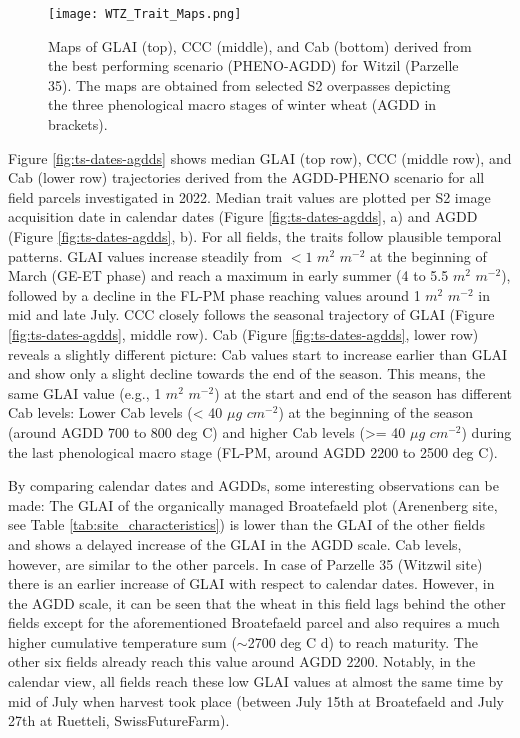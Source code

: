 \begin{figure}[H]
    \centering
    \texttt{[image: WTZ\_Trait\_Maps.png]}
    \caption[Maps of \gls{GLAI} (top), \gls{CCC} (middle), and \gls{Cab} (bottom) derived from the best performing scenario (PHENO-AGDD) for Witzil (Parzelle 35). The maps are obtained from selected \gls{S2} overpasses depicting the three phenological macro stages of winter wheat (AGDD in brackets).]{Maps of \gls{GLAI} (top), \gls{CCC} (middle), and \gls{Cab} (bottom) derived from the best performing scenario (PHENO-AGDD) for Witzil (Parzelle 35). The maps are obtained from selected \gls{S2} overpasses depicting the three phenological macro stages of winter wheat (AGDD in brackets).}
    \label{fig:trait-maps-wtz}
\end{figure}

Figure \ref{fig:ts-dates-agdds} shows median \gls{GLAI} (top row), \gls{CCC} (middle row), and \gls{Cab} (lower row) trajectories derived from the AGDD-PHENO scenario for all field parcels investigated in 2022. Median trait values are plotted per \gls{S2} image acquisition date in calendar dates (Figure \ref{fig:ts-dates-agdds}, a) and AGDD (Figure \ref{fig:ts-dates-agdds}, b). For all fields, the traits follow plausible temporal patterns. \gls{GLAI} values increase steadily from $<1$ $m^2$ $m^{-2}$ at the beginning of March (GE-ET phase) and reach a maximum in early summer (4 to 5.5 $m^2$ $m^{-2}$), followed by a decline in the FL-PM phase reaching values around 1 $m^2$ $m^{-2}$ in mid and late July. \gls{CCC} closely follows the seasonal trajectory of \gls{GLAI} (Figure \ref{fig:ts-dates-agdds}, middle row). \gls{Cab} (Figure \ref{fig:ts-dates-agdds}, lower row) reveals a slightly different picture: \gls{Cab} values start to increase earlier than \gls{GLAI} and show only a slight decline towards the end of the season. This means, the same \gls{GLAI} value (e.g., 1 $m^2$ $m^{-2}$) at the start and end of the season has different \gls{Cab} levels: Lower \gls{Cab} levels (< 40 $\mu g$ $cm^{-2}$) at the beginning of the season (around AGDD 700 to 800 deg C)  and higher \gls{Cab} levels (>= 40 $\mu g$ $cm^{-2}$) during the last phenological macro stage (FL-PM, around AGDD 2200 to 2500 deg C).

By comparing calendar dates and AGDDs, some interesting observations can be made: The \gls{GLAI} of the organically managed Broatefaeld plot (Arenenberg site, see Table \ref{tab:site_characteristics}) is lower than the \gls{GLAI} of the other fields and shows a delayed increase of the \gls{GLAI} in the AGDD scale. \gls{Cab} levels, however, are similar to the other parcels. In case of Parzelle 35 (Witzwil site) there is an earlier increase of \gls{GLAI} with respect to calendar dates. However, in the AGDD scale, it can be seen that the wheat in this field lags behind the other fields except for the aforementioned Broatefaeld parcel and also requires a much higher cumulative temperature sum ($\sim$2700 deg C d) to reach maturity. The other six fields already reach this value around AGDD 2200. Notably, in the calendar view, all fields reach these low \gls{GLAI} values at almost the same time by mid of July when harvest took place (between July 15th at Broatefaeld and July 27th at Ruetteli, SwissFutureFarm).

